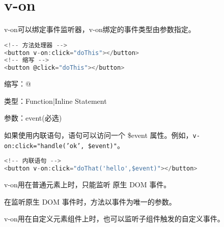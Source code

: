 \begin{lstlisting}[language=JavaScript]

\end{lstlisting}




\begin{lstlisting}[language=JavaScript]

\end{lstlisting}




\begin{lstlisting}[language=JavaScript]

\end{lstlisting}




\begin{lstlisting}[language=JavaScript]

\end{lstlisting}

\chapter{v-on}

v-on可以绑定事件监听器，v-on绑定的事件类型由参数指定。


\begin{lstlisting}[language=JavaScript]
<!-- 方法处理器 -->
<button v-on:click="doThis"></button>
<!-- 缩写 -->
<button @click="doThis"></button>
\end{lstlisting}


\begin{compactitem}
\item 缩写：@
\item 类型：Function|Inline Statement
\item 参数：event(必选)
\end{compactitem}


如果使用内联语句，语句可以访问一个 \$event 属性。例如，\texttt{v-on:click="handle('ok', \$event)"}。

\begin{lstlisting}[language=JavaScript]
<!-- 内联语句 -->
<button v-on:click="doThat('hello',$event)"></button>
\end{lstlisting}

\begin{compactitem}
\item v-on用在普通元素上时，只能监听 原生 DOM 事件。

在监听原生 DOM 事件时，方法以事件为唯一的参数。

\item v-on用在自定义元素组件上时，也可以监听子组件触发的自定义事件。
\end{compactitem}

